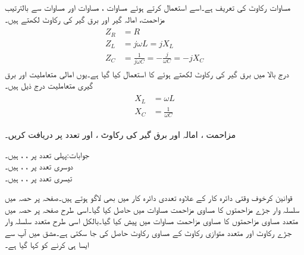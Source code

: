 مساوات  رکاوٹ کی تعریف ہے۔اسے استعمال کرتے ہوئے مساوات ، مساوات  اور مساوات  سے بالترتیب مزاحمت، امالہ گیر اور برق گیر کی رکاوٹ لکھتے ہیں۔
\begin{gather}
\begin{aligned}\label{مساوات_بدلتا_پرزوں_کی_رکاوٹ_الف}
Z_R&=R\\
Z_L&=j \omega L=j X_L\\
Z_C&=\frac{1}{j \omega C}=-\frac{j}{\omega C}=-j X_C
\end{aligned}
\end{gather}
درج بالا میں برق گیر کی رکاوٹ لکھتے ہوئے  کا استعمال کیا گیا ہے۔یوں امالی متعاملیت اور برق گیری متعاملیت درج ذیل ہیں۔
\begin{gather}
\begin{aligned}
X_L&=\omega L\\
X_C&=\frac{1}{\omega C}
\end{aligned}
\end{gather} 

مزاحمت ، امالہ  اور برق گیر  کی رکاوٹ ،  اور  تعدد پر دریافت کریں۔

جوابات:پہلی تعدد پر ، ،  ہیں۔\\
دوسری تعدد پر ، ،  ہیں۔\\
تیسری تعدد پر ، ،  ہیں۔\\

قوانین کرخوف وقتی دائرہ کار کے علاوہ تعددی دائرہ کار میں بھی لاگو ہوتے ہیں۔صفحہ  پر حصہ  میں سلسلہ وار جڑے مزاحمتوں کا مساوی مزاحمت مساوات  میں حاصل کیا گیا۔اسی طرح صفحہ  پر حصہ  میں متعدد مساوی مزاحمتوں کا مساوی مزاحمت مساوات  میں پیش کیا گیا۔بالکل اسی طرح متعدد سلسلہ وار جڑے رکاوٹ اور متعدد متوازی رکاوٹ کے مساوی رکاوٹ حاصل کی جا سکتی ہے۔مشق میں آپ سے ایسا ہی کرنے کو کہا گیا ہے۔

